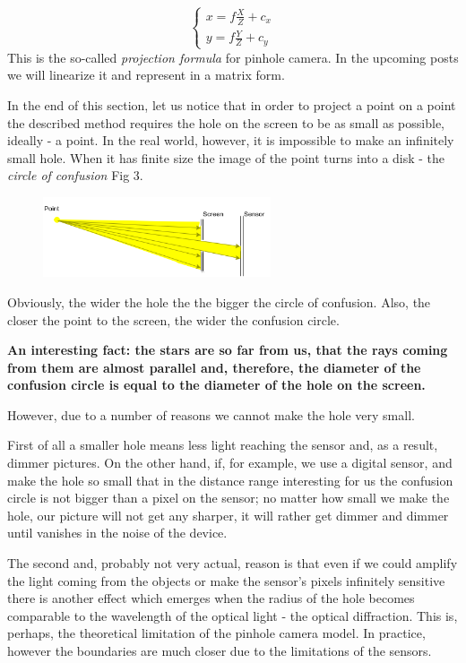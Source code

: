 \documentclass[a4paper,10pt]{article}
\begin{document}
\begin{equation}
\left\{\begin{array}{c}
x = f \frac{X}{Z} + c_x\\ 
y = f \frac{Y}{Z} + c_y
\end{array}\right.\label{projinhmg}
\end{equation}
This is the so-called {\it projection formula} for pinhole camera. In the upcoming posts we will linearize it  and represent in a matrix form. 

In the end of this section, let us notice that in order to project a point on a point the described method requires the hole on the screen to be as small as possible, ideally - a point.  In the real world, however, it is impossible to make an infinitely small hole. When it has finite size the image of the point turns into a disk - the {\it circle of confusion  } Fig 3.
\begin{figure}[h]
\centering
 \includegraphics[width=0.6\textwidth]{../../images/confusion_circle.png}
 \caption{}
\end{figure}

Obviously, the wider the hole the the bigger the  circle of confusion. Also, the closer the point to the screen, the wider the confusion circle. 

{\bf\tiny An interesting fact: the stars are so far from us, that the rays coming from them are almost parallel and, therefore, the diameter of the confusion circle is equal to the diameter of the hole on the screen.}

However, due to a number of reasons we cannot make the hole very small.

First of all a smaller hole means less light reaching the sensor and, as a result,  dimmer pictures. On the other hand, if, for example,  we use a digital sensor, and  make the hole so small that in the distance range interesting for us the confusion circle is not bigger than a pixel on the sensor; no matter how small we make the hole, our picture will not get any sharper, it will rather get dimmer and dimmer until vanishes in the noise of the device.

The second and, probably not very actual, reason is that even if we could amplify the light coming from the objects or make the sensor's pixels infinitely sensitive there is another effect which emerges when the radius of the hole becomes comparable to the wavelength of the optical light - the optical diffraction. This is, perhaps, the theoretical limitation of the pinhole camera model. In practice, however the boundaries are much closer due to the limitations of the sensors. 
\end{document}
